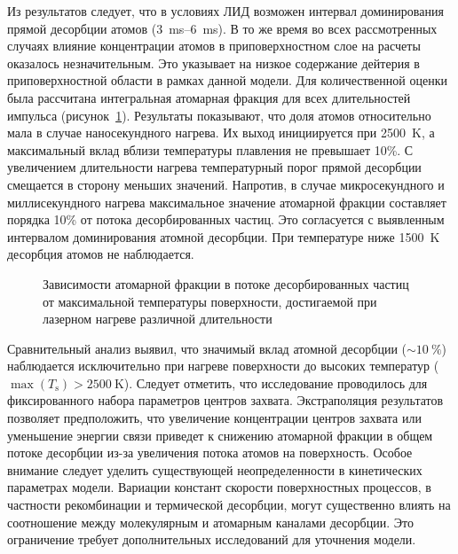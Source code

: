 Из результатов следует, что в условиях ЛИД возможен интервал доминирования прямой десорбции атомов (\SIrange{3}{6}{\milli\second}). В то же время во всех рассмотренных случаях влияние концентрации атомов в приповерхностном слое на расчеты оказалось незначительным. Это указывает на низкое содержание дейтерия в приповерхностной области в рамках данной модели. Для количественной оценки была рассчитана интегральная атомарная фракция для всех длительностей импульса (рисунок~\cref{fig:ch4/LID_atomic_fraction}). Результаты показывают, что доля атомов относительно мала в случае наносекундного нагрева. Их выход инициируется при \SI{2500}{\kelvin}, а максимальный вклад вблизи температуры плавления не превышает 10\%. С увеличением длительности нагрева температурный порог прямой десорбции смещается в сторону меньших значений. Напротив, в случае микросекундного и миллисекундного нагрева максимальное значение атомарной фракции составляет порядка 10\% от потока десорбированных частиц. Это согласуется с выявленным интервалом доминирования атомной десорбции. При температуре ниже \SI{1500}{\kelvin} десорбция атомов не наблюдается.

\begin{figure}[ht]
    \caption{Зависимости атомарной фракции в потоке десорбированных частиц от максимальной температуры поверхности, достигаемой при лазерном нагреве различной длительности}\label{fig:ch4/LID_atomic_fraction}
\end{figure}

Сравнительный анализ выявил, что значимый вклад атомной десорбции ($\sim\SI{10}{\percent}$) наблюдается исключительно при нагреве поверхности до высоких температур ($\max(T_\mathrm{s})>\SI{2500}{\kelvin}$). Следует отметить, что исследование проводилось для фиксированного набора параметров центров захвата. Экстраполяция результатов позволяет предположить, что увеличение концентрации центров захвата или уменьшение энергии связи приведет к снижению атомарной фракции в общем потоке десорбции из-за увеличения потока атомов на поверхность. Особое внимание следует уделить существующей неопределенности в кинетических параметрах модели. Вариации констант скорости поверхностных процессов, в частности рекомбинации и термической десорбции, могут существенно влиять на соотношение между молекулярным и атомарным каналами десорбции. Это ограничение требует дополнительных исследований для уточнения модели.

